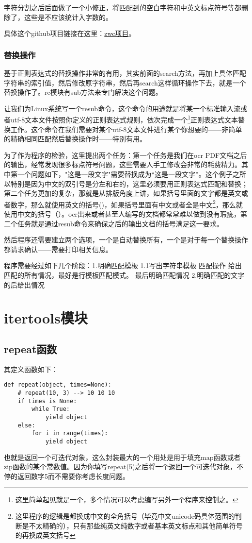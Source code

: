 \documentclass[12pt,oneside]{book}
\begin{document}
\begin{common-format}
字符分割之后后面做了一个小修正，将匹配到的空白字符和中英文标点符号等都删除了，这些是不应该统计入字数的。

具体这个github项目链接在这里：\href{https://github.com/a358003542/zwc}{zwc项目}。


\subsection{替换操作}
基于正则表达式的替换操作非常的有用，其实前面的search方法，再加上具体匹配字符串的索引值，然后修改原字符串，然后再search这样循环操作下去，就是一个替换操作了。re模块有sub方法来专门解决这个问题。

让我们为Linux系统写一个resub命令，这个命令的用途就是将某一个标准输入流或者utf-8文本文件按照你定义的正则表达式规则，依次完成一个\footnote{这里简单起见就是一个，多个情况可以考虑编写另外一个程序来控制之。}正则表达式文本替换工作。这个命令在我们需要对某个utf-8文本文件进行某个你想要的——非简单的精确相同匹配然后替换操作时——特别有用。

为了作为程序的检验，这里提出两个任务：第一个任务是我们在ocr PDF文档之后的输出，经常发现很多标点符号问题，这些需要人手工修改会非常的耗费精力。其中第一个问题如下，"这是一段文字"需要替换成为“这是一段文字”。这个例子之所以特别是因为中文的双引号是分左和右的，这里必须要用正则表达式匹配和替换；第二个任务更加的复杂，那就是从排版角度上讲，如果括号里面的文字都是英文或者数字，那么就使用英文的括号()，如果括号里面有中文或者全是中文\footnote{这里程序的逻辑是都换成中文的全角括号（毕竟中文unicode码具体范围的判断是不太精确的），只有那些纯英文纯数字或者基本英文标点和其他简单符号的再换成英文括号}，那么就使用中文的括号（）。ocr出来或者甚至人编写的文档都常常难以做到没有瑕疵，第二个任务就是通过resub命令来确保之后的输出文档的括号满足这一要求。

然后程序还需要建立两个选项，一个是自动替换所有，一个是对于每一个替换操作都请求确认——需要打印相关信息。

程序需要经过如下几个阶段：1.明确匹配模板  1.1写出字符串模板 匹配操作 给出匹配的所有情况，最好是行模板匹配模式。  最后明确匹配情况 2.明确匹配的文字的后给出情况 

\chapter{itertools模块}
\label{sec:itertools}
\section{repeat函数}
其定义函数如下：
\begin{Verbatim}
def repeat(object, times=None):
    # repeat(10, 3) --> 10 10 10
    if times is None:
        while True:
            yield object
    else:
        for i in range(times):
            yield object
\end{Verbatim}
也就是返回一个可迭代对象，这么封装最大的一个用处是用于填充map函数或者zip函数的某个常数值。因为你填写repeat(5)之后将一个返回一个可迭代对象，不停的返回数字5而不需要你考虑长度问题。


\end{common-format}
\end{document}
